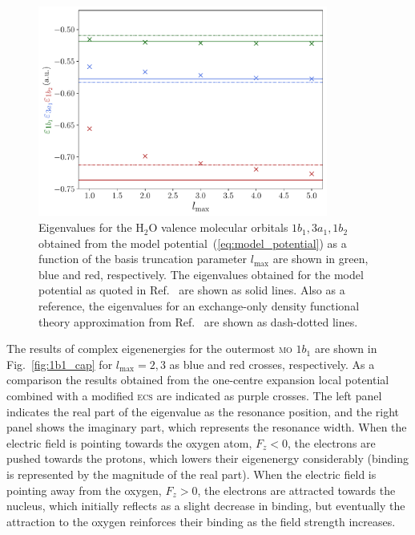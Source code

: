 \begin{figure}
  \centering
  \includegraphics[width=0.85\textwidth]{figures/ch_H2O/partial_wave/eigenvalues_fieldfree.pdf}
  \caption{Eigenvalues for the H$_{2}$O valence molecular orbitals
    $1b_{1}, 3a_{1}, 1b_{2}$ obtained from the model
    potential~(\ref{eq:model_potential}) as a function of the basis
    truncation parameter $l_{\mathrm{max}}$ are shown in green, blue
    and red, respectively. The eigenvalues obtained for the model
    potential as quoted in Ref.~\cite{illescas_2015} are shown as
    solid lines. Also as a reference, the eigenvalues for an
    exchange-only density functional theory approximation from
    Ref.~\cite{opm_2007} are shown as dash-dotted lines.}
  \label{fig:energies_fieldfree}
\end{figure}

The results of complex eigenenergies for the outermost \textsc{mo}
$1b_{1}$ are shown in Fig.~\ref{fig:1b1_cap} for $l_{\mathrm{max}} =
2,3$ as blue and red crosses, respectively. As a comparison the
results obtained from the one-centre expansion local potential
combined with a modified \textsc{ecs} are indicated as purple
crosses. The left panel indicates the real part of the eigenvalue as
the resonance position, and the right panel shows the imaginary part,
which represents the resonance width. When the electric field is
pointing towards the oxygen atom, $F_{z} < 0$, the electrons are
pushed towards the protons, which lowers their eigenenergy
considerably (binding is represented by the magnitude of the real
part). When the electric field is pointing away from the oxygen,
$F_{z} > 0$, the electrons are attracted towards the nucleus, which
initially reflects as a slight decrease in binding, but eventually the
attraction to the oxygen reinforces their binding as the field
strength increases.

